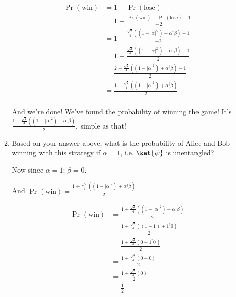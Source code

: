 \documentclass{article}
\newcommand{\abs}[1]{\left\lvert #1 \right\rvert}
\begin{document}
\begin{enumerate}
\begin{enumerate}
                $$\begin{aligned}
                    \Pr(\text{win}) & = 1-\Pr(\text{lose})                                                                   \\
                                    & = 1-\frac{\Pr(\text{win})-\Pr(\text{lose})-1}{-2}                                      \\
                                    & = 1-\frac{\frac{\sqrt{2}}{4}\left((1-\abs{\alpha}^2)+\alpha^\dagger\beta\right)-1}{-2} \\
                                    & = 1+\frac{\frac{\sqrt{2}}{4}\left((1-\abs{\alpha}^2)+\alpha^\dagger\beta\right)-1}{2}  \\
                                    & = \frac{2+\frac{\sqrt{2}}{4}\left((1-\abs{\alpha}^2)+\alpha^\dagger\beta\right)-1}{2}  \\
                                    & = \frac{1+\frac{\sqrt{2}}{4}\left((1-\abs{\alpha}^2)+\alpha^\dagger\beta\right)}{2}    \\
                  \end{aligned}$$

                And we're done! We've found the probability of winning the game! It's $\frac{1+\frac{\sqrt{2}}{4}\left((1-\abs{\alpha}^2)+\alpha^\dagger\beta\right)}{2}$, simple as that!

          \item Based on your answer above, what is the probability of Alice and Bob winning with this strategy if $\alpha=1$, i.e. $\ket{\psi}$ is unentangled?

                Now since $\alpha=1$: $\beta=0$.

                And $\Pr(\text{win})=\frac{1+\frac{\sqrt{2}}{4}\left((1-\abs{\alpha}^2)+\alpha^\dagger\beta\right)}{2}$

                $$\begin{aligned}
                    \Pr(\text{win}) & = \frac{1+\frac{\sqrt{2}}{4}\left((1-\abs{\alpha}^2)+\alpha^\dagger\beta\right)}{2} \\
                                    & = \frac{1+\frac{\sqrt{2}}{4}\left((1-1)+1^\dagger0\right)}{2}                       \\
                                    & = \frac{1+\frac{\sqrt{2}}{4}\left(0+1^\dagger0\right)}{2}                           \\
                                    & = \frac{1+\frac{\sqrt{2}}{4}\left(0+0\right)}{2}                                    \\
                                    & = \frac{1+\frac{\sqrt{2}}{4}\left(0\right)}{2}                                      \\
                                    & = \frac{1}{2}                                                                       \\
                  \end{aligned}$$


\end{enumerate}
\end{enumerate}
\end{document}
